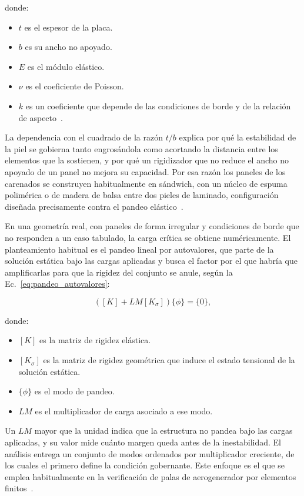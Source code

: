 donde:
\begin{itemize}
    \item $t$ es el espesor de la placa.
    \item $b$ es su ancho no apoyado.
    \item $E$ es el módulo elástico.
    \item $\nu$ es el coeficiente de Poisson.
    \item $k$ es un coeficiente que depende de las condiciones de borde y de la relación de aspecto~\parencite{Timoshenko1961}.
\end{itemize}

La dependencia con el cuadrado de la razón $t/b$ explica por qué la estabilidad de la piel se gobierna tanto engrosándola como acortando la distancia entre los elementos que la sostienen, y por qué un rigidizador que no reduce el ancho no apoyado de un panel no mejora su capacidad. Por esa razón los paneles de los carenados se construyen habitualmente en sándwich, con un núcleo de espuma polimérica o de madera de balsa entre dos pieles de laminado, configuración diseñada precisamente contra el pandeo elástico~\parencite{Mishnaevsky2017}.

En una geometría real, con paneles de forma irregular y condiciones de borde que no responden a un caso tabulado, la carga crítica se obtiene numéricamente. El planteamiento habitual es el pandeo lineal por autovalores, que parte de la solución estática bajo las cargas aplicadas y busca el factor por el que habría que amplificarlas para que la rigidez del conjunto se anule, según la Ec.~\ref{eq:pandeo_autovalores}:

\begin{equation}
    \left( \left[ K \right] + LM \left[ K_{\sigma} \right] \right) \{\phi\} = \{0\},
    \label{eq:pandeo_autovalores}
\end{equation}

donde:
\begin{itemize}
    \item $[K]$ es la matriz de rigidez elástica.
    \item $[K_{\sigma}]$ es la matriz de rigidez geométrica que induce el estado tensional de la solución estática.
    \item $\{\phi\}$ es el modo de pandeo.
    \item $LM$ es el multiplicador de carga asociado a ese modo.
\end{itemize}

Un $LM$ mayor que la unidad indica que la estructura no pandea bajo las cargas aplicadas, y su valor mide cuánto margen queda antes de la inestabilidad. El análisis entrega un conjunto de modos ordenados por multiplicador creciente, de los cuales el primero define la condición gobernante. Este enfoque es el que se emplea habitualmente en la verificación de palas de aerogenerador por elementos finitos~\parencite{Boudounit2020,Hameed2015}.

